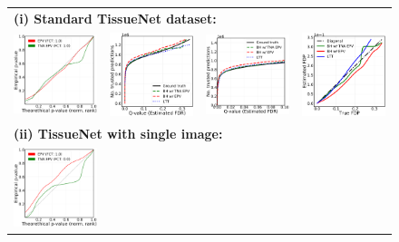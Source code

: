 \documentclass{article}
\begin{document}
\begin{figure}[h!]
	
	\begin{tabular}{cccc}
		\multicolumn{4}{l}{\bf (i) Standard TissueNet dataset:}\\		
		\includegraphics[width=1.7in]{img/cnn_QQ_cells_segment.png} &
		\includegraphics[width=1.7in]{img/cnn_cells_segment_fdr_control.png} & 
		\includegraphics[width=1.7in]{img/cnn_cells_segment_fdr_control_loc.png} & 
		\includegraphics[width=1.7in]{img/cnn_FDPscat_cells_segment.png}\\	
		\multicolumn{4}{l}{\bf (ii) TissueNet with single image:}\\		
		\includegraphics[width=1.7in]{img/cnn_QQ_cells_balanced.png} &

\end{tabular}
\end{figure}
\end{document}
